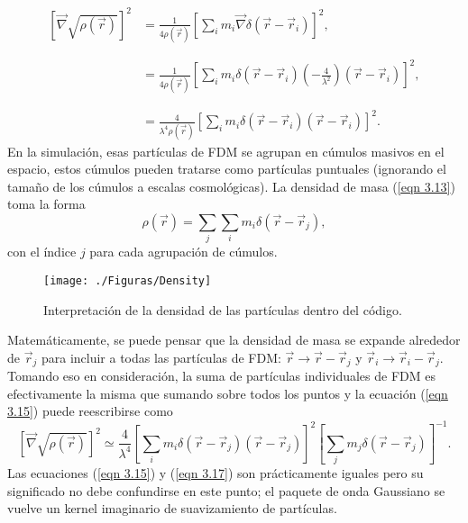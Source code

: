 \documentclass[a4paper,openright,10pt, oneside, final]{book}
\begin{document}
\begin{equation}
\begin{array}{ll}
\left[\vec{\nabla}\sqrt{\rho (\vec{r})}\right]^{2} &=
\frac{1}{4\rho(\vec{r})}\left[\sum_{i} m_{i}\vec{\nabla}\delta(\vec{r}-\vec{r}_{i})\right]^{2}, \\\\\\ 
&=
\frac{1}{4\rho(\vec{r})} 
\left[\sum_{i}
m_{i}\delta(\vec{r}-\vec{r}_{i})(-\frac{4}{\lambda^{2}})(\vec{r}-\vec{r}_{i})\right]^{2}, \\\\\\
&=
\frac{4}{\lambda^{4}\rho(\vec{r})}
\left[
\sum_{i} m_{i}\delta(\vec{r}-\vec{r}_{i})(\vec{r}-\vec{r}_{i})
\right]^{2}. \label{eqn 3.15}

\end{array}
\end{equation}
En la simulación, esas partículas de FDM se agrupan en cúmulos masivos en el espacio, estos cúmulos pueden tratarse como partículas puntuales (ignorando el tamaño de los cúmulos a escalas cosmológicas). La densidad de masa (\ref{eqn 3.13}) toma la forma
\begin{equation}
\rho(\vec{r})
=
\sum_{j}\sum_{i}m_{i}\delta(\vec{r}-\vec{r}_{j}),\label{eqn 3.16}
\end{equation} 
con el índice $j$ para cada agrupación de cúmulos. 

\begin{figure}
\centering
\texttt{[image: ./Figuras/Density]}
\caption{\footnotesize{Interpretación de la densidad de las partículas dentro del código.}}
\end{figure}

Matemáticamente, se puede pensar que la densidad de masa se expande alrededor de $\vec{r}_{j}$ para incluir a todas las partículas de FDM: $\vec{r} \rightarrow \vec{r}-\vec{r}_{j}$ y $\vec{r}_{i} \rightarrow \vec{r}_{i} - \vec{r}_{j}$. Tomando eso en consideración, la suma de partículas individuales de FDM es efectivamente la misma que sumando sobre todos los puntos y la ecuación (\ref{eqn 3.15}) puede reescribirse como 
\begin{equation}
\left[\vec{\nabla}\sqrt{\rho (\vec{r})}\right]^{2} \simeq 
\frac{4}{\lambda^{4}}
\left[
\sum_{i}m_{i}\delta(\vec{r}-\vec{r}_{j})(\vec{r}-\vec{r}_{j})
\right]^{2}
\left[
\sum_{j}m_{j}\delta(\vec{r}-\vec{r}_{j})
\right]^{-1}. \label{eqn 3.17}
\end{equation}
Las ecuaciones (\ref{eqn 3.15}) y (\ref{eqn 3.17}) son prácticamente iguales pero su significado no debe confundirse en este punto; el paquete de onda Gaussiano se vuelve un kernel imaginario de suavizamiento de partículas.
\end{document}
